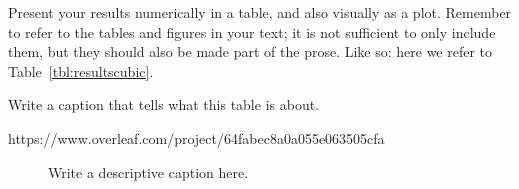 \documentclass[12pt, a4paper]{article}
\begin{document}
Present your results numerically in a table, and also visually as a
plot. Remember to refer to the tables and figures in your text; it is
not sufficient to only include them, but they should also be made part
of the prose. Like so: here we refer to Table~\ref{tbl:resultscubic}.

\begin{table}[h]
  \begin{center}
  \caption{Write a caption that tells what this table is about.}
  \label{tbl:resultscubic}
  \end{center}
\end{table}
https://www.overleaf.com/project/64fabec8a0a055e063505cfa
\begin{figure}[h]
  \begin{center}
    \caption{Write a descriptive caption here.}
    \label{fig:runtimes}
  \end{center}
\end{figure}
\end{document}
